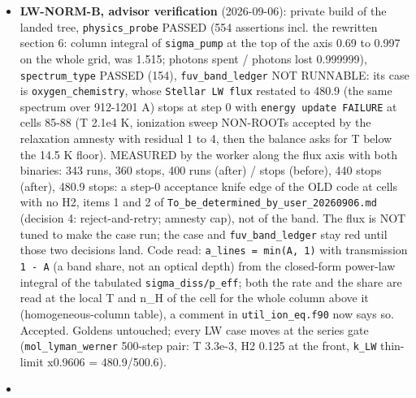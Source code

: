 \documentclass[english,a4paper]{my_memo}
\begin{document}
\begin{itemize}
  whose free energy sets the H + H \textless-\textgreater{} H2 equilibrium. The probe that greps
  the tree for a second sum went RED (1) -\textgreater{} GREEN (0). Impact (advisor
  measured, 12000-step snapshots, \texttt{OMP\_NUM\_THREADS=1}): \texttt{mol\_ir\_bands} (9
  output files) and \texttt{mol\_base\_handoff} (7 files) BYTE-IDENTICAL before and
  after, Mdot 7.99 both; the retired copy had an \texttt{exp(-min(E/T,\ 700))}
  clamp whose only difference from the shared sum\textquotesingle s \texttt{exp(-E/T)} is below
  double rounding. No golden moves. The worker\textquotesingle s draft report stopped at
  "impact runs in progress"; this entry closes it.
\item
  \textbf{LW-NORM-B, advisor verification} (2026-09-06): private build of the
  landed tree, \texttt{physics\_probe} PASSED (554 assertions incl. the rewritten
  section 6: column integral of \texttt{sigma\_pump} at the top of the axis 0.69 to
  0.997 on the whole grid, was 1.515; photons spent / photons lost 0.999999),
  \texttt{spectrum\_type} PASSED (154), \texttt{fuv\_band\_ledger} NOT RUNNABLE: its case is
  \texttt{oxygen\_chemistry}, whose \texttt{Stellar\ LW\ flux} restated to 480.9 (the same
  spectrum over 912-1201 A) stops at step 0 with \texttt{energy\ update\ FAILURE} at
  cells 85-88 (T 2.1e4 K, ionization sweep NON-ROOTs accepted by the
  relaxation amnesty with residual 1 to 4, then the balance asks for T below
  the 14.5 K floor). MEASURED by the worker along the flux axis with both
  binaries: 343 runs, 360 stops, 400 runs (after) / stops (before), 440
  stops (after), 480.9 stops: a step-0 acceptance knife edge of the OLD code
  at cells with no H2, items 1 and 2 of \texttt{To\_be\_determined\_by\_user\_20260906.md}
  (decision 4: reject-and-retry; amnesty cap), not of the band. The flux is
  NOT tuned to make the case run; the case and \texttt{fuv\_band\_ledger} stay red
  until those two decisions land. Code read: \texttt{a\_lines\ =\ min(A,\ 1)} with
  transmission \texttt{1\ -\ A} (a band share, not an optical depth) from the
  closed-form power-law integral of the tabulated \texttt{sigma\_diss/p\_eff}; both
  the rate and the share are read at the local T and n\_H of the cell for the
  whole column above it (homogeneous-column table), a comment in
  \texttt{util\_ion\_eq.f90} now says so. Accepted. Goldens untouched; every LW case
  moves at the series gate (\texttt{mol\_lyman\_werner} 500-step pair: T 3.3e-3, H2
  0.125 at the front, \texttt{k\_LW} thin-limit x0.9606 = 480.9/500.6).
\item

\end{itemize}
\end{document}
